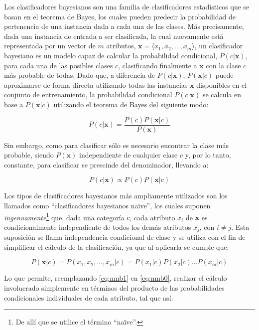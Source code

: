 Los clasificadores bayesianos son una familia de clasificadores estadísticos que se basan en el teorema de Bayes, los cuales pueden predecir la probabilidad de pertenencia de una instancia dada a cada una de las clases\cite{murphy2006naive, rish2001empirical}. Más precisamente, dada una instancia de entrada a ser clasificada, la cual nuevamente está representada por un vector de $m$ atributos, $\pmb{x}=\langle x_1,x_2,\dots,x_m\rangle$, un clasificador bayesiano es un modelo capaz de calcular la probabilidad condicional, $P(c|\pmb{x})$, para cada una de las posibles clases $c$, clasificando finalmente a $\pmb{x}$ con la clase $c$ más probable de todas. Dado que, a diferencia de $P(c|\pmb{x})$, $P(\pmb{x}|c)$ puede aproximarse de forma directa utilizando todas las instancias $\pmb{x}$ disponibles en el conjunto de entrenamiento, la probabilidad condicional $P(c|\pmb{x})$ se calcula en base a $P(\pmb{x}|c)$ utilizando el teorema de Bayes del siguiente modo:

$$P(c|\pmb{x})=\frac{P(c)P(\pmb{x}|c)}{P(\pmb{x})}$$

Sin embargo, como para clasificar sólo es necesario encontrar la clase más probable, siendo $P(\pmb{x})$ independiente de cualquier clase $c$ y, por lo tanto, constante, para clasificar se prescinde del denominador, llevando a:

\begin{equation}
P(c|\pmb{x})\propto P(c)P(\pmb{x}|c)
\label{eq:mnb0}
\end{equation}


Los tipos de clasificadores bayesianos más ampliamente utilizados son los llamados como ``clasificadores bayesianos naïve'', los cuales suponen \emph{ingenuamente}\footnote{De allí que se utilice el término ``naïve''.} que, dada una categoría $c$, cada atributo $x_i$ de $\pmb{x}$ es condicionalmente independiente de todos los demás atributos $x_j$, con $i\ne j$.
Esta suposición se llama independencia condicional de clase\cite{lewis1998naive} y se utiliza con el fin de simplificar el cálculo de la clasificación, ya que al aplicarla se cumple que:

\begin{equation}
P(\pmb{x}|c)=P(x_1,x_2,\dots,x_m|c) = P(x_1|c)P(x_2|c)\dots P(x_m|c)
\label{eq:mnb1}
\end{equation}

Lo que permite, reemplazando \autoref{eq:mnb1} en \autoref{eq:mnb0}, realizar el cálculo involucrado simplemente en términos del producto de las probabilidades condicionales individuales de cada atributo, tal que así:

